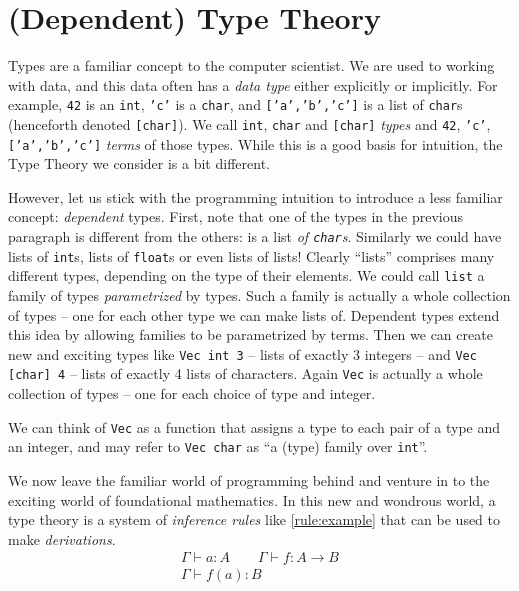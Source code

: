 \section{(Dependent) Type Theory}\label{sec/typetheory}
Types are a familiar concept to the computer scientist. We are used to working
with data, and this data often has a \emph{data type} either explicitly or
implicitly. For example, \texttt{42} is an \texttt{int}, \texttt{'c'} is a
\texttt{char}, and \texttt{['a','b','c']} is a list of \texttt{char}s (henceforth
denoted \texttt{[char]}). We call
\texttt{int}, \texttt{char} and \texttt{[char]} \emph{types} and
\texttt{42}, \texttt{'c'}, \texttt{['a','b','c']} \emph{terms} of those types.
While this is a good basis for intuition, the Type Theory we consider is a bit different.

However, let us stick with the programming intuition to introduce a less
familiar concept: \emph{dependent} types. First, note that one of the types in
the previous paragraph is different from the others: \text{['a','b','c']} is a
list \emph{of \texttt{char}s}. Similarly we could have lists of \texttt{int}s,
lists of \texttt{float}s or even lists of lists! Clearly ``lists'' comprises
many different types, depending on the type of their elements. We could call
\texttt{list} a family of types \emph{parametrized} by types. Such a family is
actually a whole collection of types -- one for each other type we can make
lists of.
Dependent types extend this idea by allowing families to be parametrized by
terms. Then we can create new and exciting types like \texttt{Vec int 3} --
lists of exactly 3 integers -- and \texttt{Vec [char] 4} -- lists of exactly 4
lists of characters. Again \texttt{Vec} is actually a whole collection of types
-- one for each choice of type and integer.

We can think of \texttt{Vec} as a function that assigns a type to each pair of a
type and an integer, and may refer to \texttt{Vec char} as ``a (type) family over \texttt{int}''.

We now leave the familiar world of programming behind and venture in to the
exciting world of foundational mathematics.
In this new and wondrous world, a type theory is a system of \emph{inference
  rules} like \ref{rule:example} that can be used to make \emph{derivations}.
\begin{equation}
  \begin{array}{c}
    \Gamma \vdash a : A \qquad \Gamma \vdash f : A \rightarrow B\\
    \hline
    \Gamma \vdash f(a) : B
  \end{array}
  \label{rule:example}
\end{equation}

